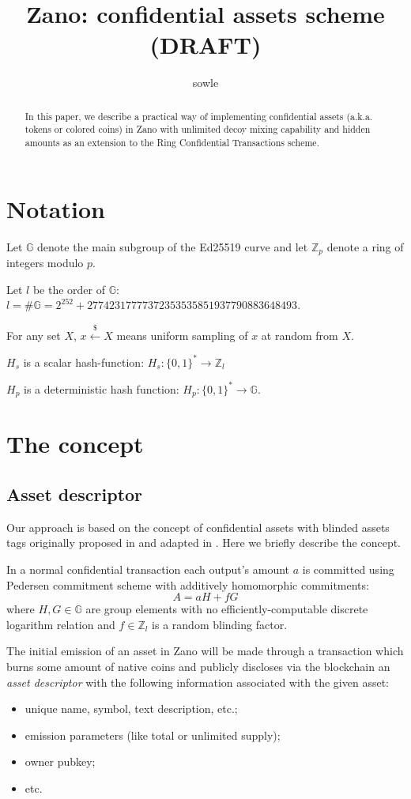 \documentclass{article}
\title{\huge{Zano: confidential assets scheme \\ (DRAFT)}}
\author{sowle}
\begin{document}
\maketitle

\begin{abstract}
    In this paper, we describe a practical way of implementing confidential assets (a.k.a. tokens or colored coins) in Zano with unlimited decoy mixing capability and hidden amounts as an extension to the Ring Confidential Transactions scheme.
\end{abstract}

\section{Notation}
Let $\mathbb{G}$ denote the main subgroup of the Ed25519 curve and let $\mathbb{Z}_p$ denote a ring of integers modulo $p$.

Let $l$ be the order of $\mathbb{G}$: $l = \#\mathbb{G} = 2^{252} + 27742317777372353535851937790883648493$.

For  any  set $X$, $x \stackrel{\$}{\leftarrow} X$ means uniform  sampling of $x$ at random from $X$. 

$H_s$ is a scalar hash-function: $H_s:\{0,1\}^* \to \mathbb{Z}_l$

$H_p$ is a deterministic hash function: $H_p:\{0,1\}^* \to \mathbb{G}$.

\section{The concept}
\subsection{Asset descriptor}
Our approach is based on the concept of confidential assets with blinded assets tags originally proposed in \cite{conf_assets} and adapted in \cite{lelantus_cla}. Here we briefly describe the concept.

In a normal confidential transaction each output's amount $a$ is committed using Pedersen commitment scheme with additively homomorphic commitments:
\[ A = aH + fG \]
where $H, G \in \mathbb{G}$ are group elements with no efficiently-computable discrete logarithm relation and $f \in \mathbb{Z}_l$ is a random blinding factor.

The initial emission of an asset in Zano will be made through a transaction which burns some amount of native coins and publicly discloses via the blockchain an \textit{asset descriptor} with the following information associated with the given asset:
\begin{itemize}
    \item unique name, symbol, text description, etc.;
    \item emission parameters (like total or unlimited supply);
    \item owner pubkey;
    \item etc.
\end{itemize}
\end{document}
